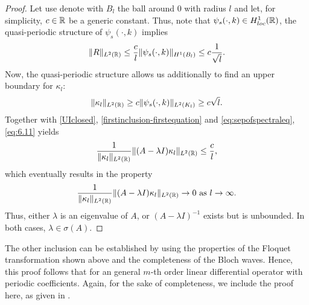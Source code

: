 \begin{theorem}
\begin{proof}
		Let use denote with $B_{l}$ the ball around $0$ with radius $l$ and let, for simplicity, $c \in \mathbb{R}$ be a generic constant. Thus, note that $\psi_{s}(\cdot, k) \in H^{1}_{loc}(\mathbb{R})$, the quasi-periodic structure of $\psi_{s}(\cdot, k)$ implies
		\begin{equation}
			 \| R \|_{L^{2}(\mathbb{R})} \leq \frac{c}{l} \| \psi_{s}(\cdot, k) \|_{H^{1}(B_{l})} \leq c \frac{1}{\sqrt{l}}. \label{eq:estimofR}
		\end{equation}
		Now, the quasi-periodic structure allows us additionally to find an upper boundary for $\kappa_{l}$:
		\begin{equation}
			\| \kappa_{l} \|_{L^{2}(\mathbb{R})} \geq c \| \psi_{s}(\cdot, k) \|_{L^{2}(K_{l})} \geq c \sqrt{l}. \label{eq:6.11}
		\end{equation} 
		Together with \eqref{UIclosed}, \eqref{firstinclusion-firstequation} and \eqref{eq:sepofspectraleq}, \eqref{eq:6.11} yields
		\[ \frac{1}{\|\kappa_{l}\|_{L^{2}(\mathbb{R})}}\| (A - \lambda I) \kappa_{l} \|_{L^{2}(\mathbb{R})} \leq \frac{c}{l}, \]
		which eventually results in the property
			\[ \frac{1}{\|\kappa_{l} \|_{L^{2}(\mathbb{R})}} \| (A - \lambda I) \kappa_{l} \|_{L^{2}(\mathbb{R})} \rightarrow 0 \text{ as } l \rightarrow \infty. \]
		Thus, either $\lambda$ is an eigenvalue of $A$, or $(A - \lambda I)^{-1}$ exists but is unbounded. In both cases, $\lambda \in \sigma(A)$.
	\end{proof}
\end{theorem}	

The other inclusion can be established by using the properties of the Floquet transformation shown above and the completeness of the Bloch waves. Hence, this proof follows that for an general $m$-th order linear differential operator with periodic coefficients. Again, for the sake of completeness, we include the proof here, as given in \cite[Section 3.6]{dorfler2011photonic}.

